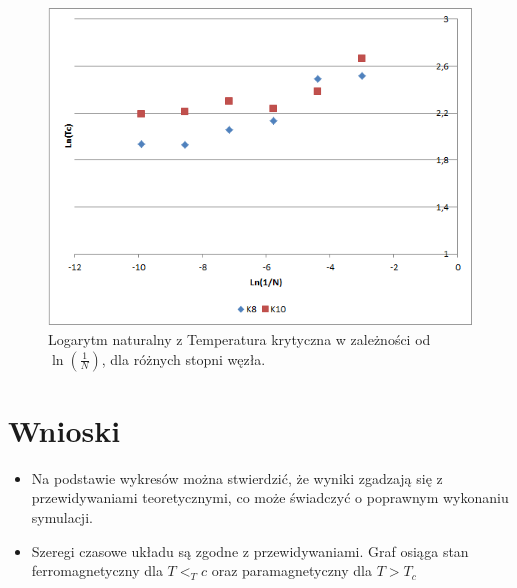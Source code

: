 \documentclass[12pt,a4paper]{article}
\begin{document}
\begin{figure}
\includegraphics[width=\textwidth]{LNK8K10.png}
\caption{Logarytm naturalny z Temperatura krytyczna w zależności od $\ln(\frac{1}{N})$, dla różnych stopni węzła.}
\label{fig:LnTcOd1/N.2}
\end{figure}

\section{Wnioski}
\begin{itemize}
\item Na podstawie wykresów można stwierdzić, że wyniki zgadzają się z przewidywaniami teoretycznymi, co może świadczyć o poprawnym wykonaniu symulacji.
\item Szeregi czasowe układu są zgodne z przewidywaniami. Graf osiąga stan ferromagnetyczny dla $T<_T{c}$ oraz paramagnetyczny dla $T>T_{c}$
\end{itemize}
\end{document}
